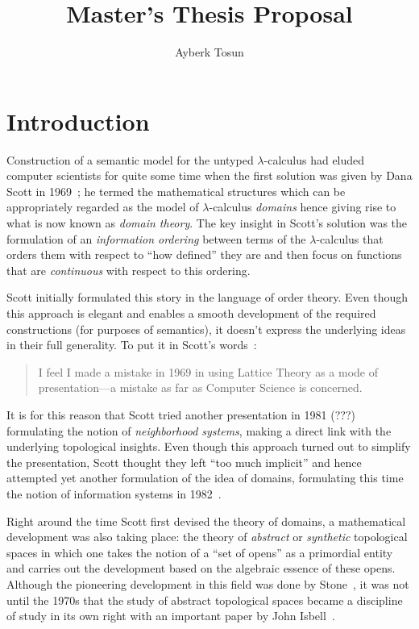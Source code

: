 \documentclass[11pt]{article}
\title{Master's Thesis Proposal}
\author{Ayberk Tosun}
\begin{document}
\maketitle

\section{Introduction}

Construction of a semantic model for the untyped $\lambda$-calculus had eluded computer
scientists for quite some time when the first solution was given by Dana Scott in
1969~\cite{scott:1969}; he termed the mathematical structures which can be appropriately
regarded as the model of $\lambda$-calculus \emph{domains} hence giving rise to what is now
known as \emph{domain theory}. The key insight in Scott's solution was the formulation of
an \emph{information ordering} between terms of the $\lambda$-calculus that orders them with
respect to ``how defined'' they are and then focus on functions that are \emph{continuous}
with respect to this ordering.

Scott initially formulated this story in the language of order theory. Even though this
approach is elegant and enables a smooth development of the required constructions (for
purposes of semantics), it doesn't express the underlying ideas in their full generality.
To put it in Scott's words~\cite[pg.~577]{scott:1982}:

\begin{quote}
  I feel I made a mistake in 1969 in using Lattice Theory as a mode of
  presentation---a mistake as far as Computer Science is concerned.
\end{quote}

It is for this reason that Scott tried another presentation in 1981 (???) formulating the
notion of \emph{neighborhood systems}, making a direct link with the underlying
topological insights. Even though this approach turned out to simplify the presentation,
Scott thought they left ``too much implicit'' and hence attempted yet another formulation
of the idea of domains, formulating this time the notion of information systems in
1982~\cite{scott:1982}.

Right around the time Scott first devised the theory of domains, a mathematical
development was also taking place: the theory of \emph{abstract} or \emph{synthetic}
topological spaces in which one takes the notion of a ``set of opens'' as a primordial
entity and carries out the development based on the algebraic essence of these opens.
Although the pioneering development in this field was done by Stone~\cite{stone:1934}, it
was not until the 1970s that the study of abstract topological spaces became a discipline
of study in its own right with an important paper by John Isbell~\cite{isbell:1973}.
\end{document}
